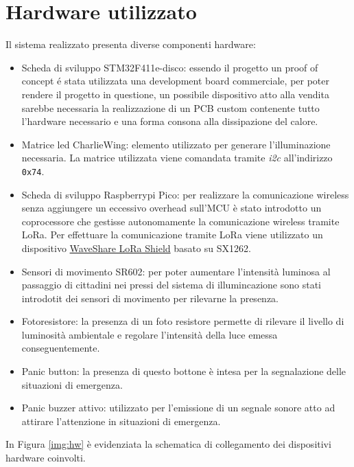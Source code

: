 \documentclass{article}
\begin{document}
	\section{Hardware utilizzato}
	Il sistema realizzato presenta diverse componenti hardware:
	\begin{itemize}
		\item Scheda di sviluppo STM32F411e-disco: essendo il progetto un proof of concept é stata utilizzata una development board commerciale, per poter rendere il progetto in questione, un possibile dispositivo atto alla vendita sarebbe necessaria la realizzazione di un PCB custom contenente tutto l'hardware necessario e una forma consona alla dissipazione del calore.
		\item Matrice led CharlieWing: elemento utilizzato per generare l'illuminazione necessaria. La matrice utilizzata viene comandata tramite \textit{i2c} all'indirizzo \texttt{0x74}.
		\item Scheda di sviluppo Raspberrypi Pico: per realizzare la comunicazione wireless senza aggiungere un eccessivo overhead sull'MCU \`e stato introdotto un coprocessore che gestisse autonomamente la comunicazione wireless tramite LoRa. 	Per effettuare la comunicazione tramite LoRa viene utilizzato un dispositivo \href{https://www.waveshare.com/wiki/Pico-LoRa-SX1262}{WaveShare LoRa Shield} basato su SX1262.
		\item Sensori di movimento SR602: per poter aumentare l'intensit\`a luminosa al passaggio di cittadini nei pressi del sistema di illumincazione sono stati introdotit dei sensori di movimento per rilevarne la presenza.
		\item Fotoresistore: la presenza di un foto resistore permette di rilevare il livello di luminosit\`a ambientale e regolare l'intensit\`a della luce emessa conseguentemente.
		\item Panic button: la presenza di questo bottone \`e intesa per la segnalazione delle situazioni di emergenza.
		\item Panic buzzer attivo: utilizzato per l'emissione di un segnale sonore atto ad attirare l'attenzione in situazioni di emergenza.
	\end{itemize}
	In Figura \ref{img:hw} \`e evidenziata la schematica di collegamento dei dispositivi hardware coinvolti.
	
\end{document}

